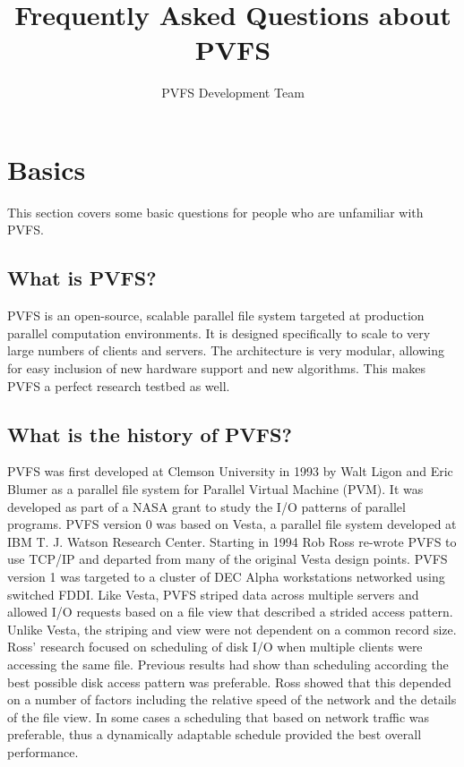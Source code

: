 \documentclass[11pt,letterpaper]{article}
\title{Frequently Asked Questions about PVFS}
\author{ PVFS Development Team }
\begin{document}
\maketitle

\tableofcontents

\thispagestyle{empty}

%
%
\section{Basics}

This section covers some basic questions for people who are unfamiliar with PVFS.

\subsection{What is PVFS?}

PVFS is an open-source, scalable parallel file system targeted at production
parallel computation environments.  It is designed specifically to scale to
very large numbers of clients and servers.  The architecture is very modular,
allowing for easy inclusion of new hardware support and new algorithms.  This
makes PVFS a perfect research testbed as well.

\subsection{What is the history of PVFS?}

PVFS was first developed at Clemson University in 1993
by Walt Ligon and Eric Blumer as a parallel file system for
Parallel Virtual Machine (PVM).  It was developed as part of a
NASA grant to study the I/O patterns of parallel programs. PVFS version
0 was based on Vesta, a parallel file system developed at IBM T. J.
Watson Research Center.  Starting in 1994 Rob Ross re-wrote PVFS to
use TCP/IP and departed from many of the original Vesta design points.
PVFS version 1 was targeted to a cluster of DEC Alpha workstations
networked using switched FDDI. Like Vesta, PVFS striped data across
multiple servers and allowed I/O requests based on a file view that
described a strided access pattern. Unlike Vesta, the striping and view
were not dependent on a common record size. Ross' research focused on
scheduling of disk I/O when multiple clients were accessing the same
file. Previous results had show than scheduling according the best
possible disk access pattern was preferable. Ross showed that this
depended on a number of factors including the relative speed of the
network and the details of the file view. In some cases a scheduling
that based on network traffic was preferable, thus a dynamically
adaptable schedule provided the best overall performance.
\end{document}
